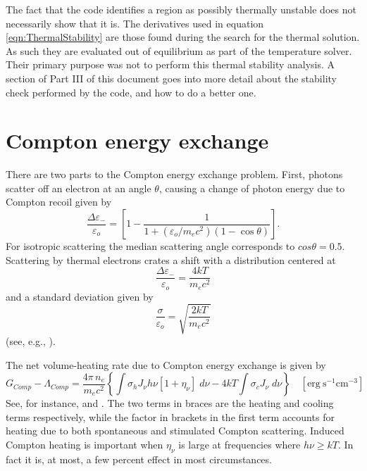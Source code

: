 The fact that the code identifies a region as possibly thermally unstable
does not necessarily show that it is.  The derivatives used in equation
\ref{eqn:ThermalStability} are those found during the search for the thermal solution.  As such they
are evaluated out of equilibrium as part of the temperature solver.
Their
primary purpose was not to perform this thermal stability analysis.  A
section of Part III of this document goes into more detail about the
stability check performed by the code, and how to do a better one.

\section{Compton energy exchange}

There are two parts to the Compton energy exchange problem.  First,
photons scatter off an electron at an angle $\theta$, causing a change of photon
energy due to Compton recoil given by
\begin{equation}
\label{eqn:ComptonEnergyShift}
\frac{{\Delta {\varepsilon _ - }}}{{{\varepsilon _o}}} = \left[ {1 -
\frac{1}{{1 + \left( {{\varepsilon _o}/{m_e}{c^2}} \right)\left( {1 - \cos
\theta } \right)}}} \right].
\end{equation}
For isotropic scattering the median scattering angle corresponds to
$cos \theta = 0.5$.  Scattering by thermal electrons crates a shift with a distribution
centered at
\begin{equation}
\frac{{\Delta {\varepsilon _ - }}}{{{\varepsilon _o}}} =
\frac{{4kT}}{{{m_e}{c^2}}}
\end{equation}
and a standard deviation given by
\begin{equation}
\frac{\sigma }{{{\varepsilon _o}}} = \sqrt {\frac{{2kT}}{{{m_e}{c^2}}}}
\end{equation}
(see, e.g., \citealp{Zycki1994}).

The net volume-heating rate due to Compton energy exchange is given by
\begin{equation}
\label{eqn:ComptonEnergyExchange}
{G_{Comp}} - {\Lambda _{Comp}} = \frac{{4\pi \,{n_e}}}{{{m_e}{c^2}}}\left\{
{\int {{\sigma _h}{J_\nu }h\nu \left[ {1 + {\eta _\nu }} \right]} \;d\nu
- 4kT\int {{\sigma _c}{J_\nu }\;d\nu } } \right\}\quad [\mathrm{erg~s}^{-1}
\mathrm{cm}^{-3}]
\end{equation}
See, for instance, \citep{Levich1970} and \citep{Krolik1981}.  The two terms in braces are the heating and cooling terms
respectively, while the factor in brackets in the first term accounts for
heating due to both spontaneous and stimulated Compton scattering.  Induced
Compton heating is important when $\eta_\nu$ is large at frequencies where
$h\nu\ge kT$.
In fact it is, at most, a few percent effect in most circumstances.

